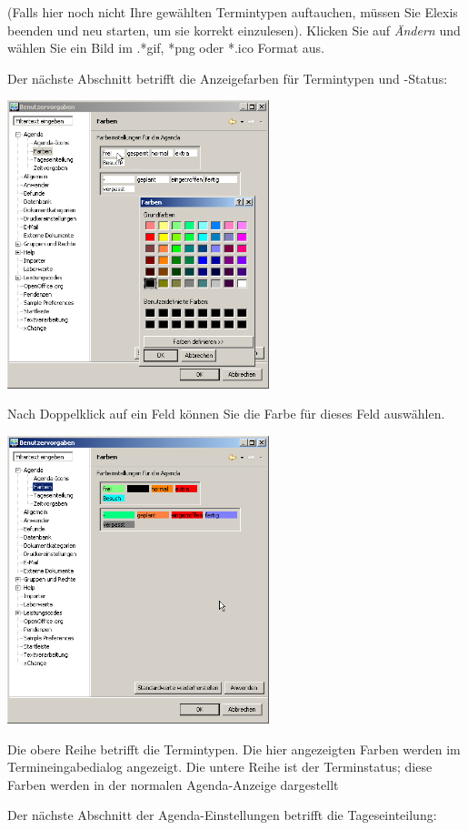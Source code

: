 (Falls hier noch nicht Ihre gewählten Termintypen auftauchen, müssen Sie Elexis beenden und neu starten, um sie korrekt einzulesen).
Klicken Sie auf  \textit{Ändern} und wählen Sie ein Bild im .*gif, *png oder *.ico Format aus.

Der nächste Abschnitt betrifft die Anzeigefarben für Termintypen und -Status:

\includegraphics[width=3in]{images/settings3}

Nach Doppelklick auf ein Feld können Sie die Farbe für dieses Feld auswählen.

\includegraphics[width=3in]{images/settings4.png}


Die obere Reihe betrifft die Termintypen. Die hier angezeigten Farben werden im Termineingabedialog angezeigt.
Die untere Reihe ist der Terminstatus; diese Farben werden in der normalen Agenda-Anzeige dargestellt

Der nächste Abschnitt der Agenda-Einstellungen betrifft die Tageseinteilung:

